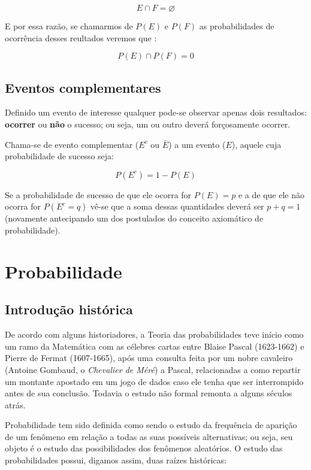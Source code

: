 \documentclass[
]{book}
\begin{document}
\[
E \cap F = \varnothing 
\]

E por essa razão, se chamarmos de \(P(E)\) e \(P(F)\) as probabilidades de ocorrência desses reultados veremos que :

\[
P(E) \cap P(F) = 0
\]

\hypertarget{eventos-complementares}{%
\subsection{Eventos complementares}\label{eventos-complementares}}

Definido um evento de interesse qualquer pode-se observar apenas dois resultados: \textbf{ocorrer} ou \textbf{não} o sucesso; ou seja, um ou outro deverá forçosamente ocorrer.

Chama-se de evento complementar (\(E^{c}\) ou \(\stackrel{-}{E}\)) a um evento (\(E\)), aquele cuja probabilidade de sucesso seja:

\[
P(E^{c}) = 1 - P(E)
\]

Se a probabilidade de sucesso de que ele ocorra for \(P(E)=p\) e a de que ele não ocorra for \(P(E^{c}= q)\) vê-se que a soma dessas quantidades deverá ser \(p + q =1\) (novamente antecipando um dos postulados do conceito axiomático de probabilidade).

\hypertarget{probabilidade}{%
\section{Probabilidade}\label{probabilidade}}

\hypertarget{introduuxe7uxe3o-histuxf3rica}{%
\subsection{Introdução histórica}\label{introduuxe7uxe3o-histuxf3rica}}

De acordo com alguns historiadores, a Teoria das probabilidades teve início como um ramo da Matemática com as célebres cartas entre Blaise Pascal (1623-1662) e Pierre de Fermat (1607-1665), após uma consulta feita por um nobre cavaleiro (Antoine Gombaud, o \emph{Chevalier de Méré}) a Pascal, relacionadas a como repartir um montante apostado em um jogo de dados caso ele tenha que ser interrompido antes de sua conclusão. Todavia o estudo não formal remonta a alguns séculos atrás.

\hfill\break

Probabilidade tem sido definida como sendo o estudo da frequência de aparição de um fenômeno em relação a todas as suas possíveis alternativas; ou seja, seu objeto é o estudo das possibilidades dos fenômenos aleatórios. O estudo das probabilidades possui, digamos assim, duas raízes históricas:
\end{document}
